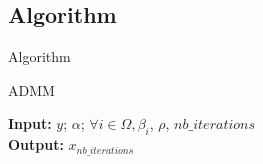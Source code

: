 \subsection{Algorithm}

\frame{
    \tableofcontents[ 
        currentsubsection, 
    ]
}

\begin{frame}{Algorithm}
\begin{algorithm}[H]
    \caption{ADMM} %
    \begin{algorithmic}[1]
        \newline
        \textbf{Input:} $y$; $\alpha$; $\forall i \in \Omega, \beta_{i}$, $\rho$, $nb\_iterations$ \\
        \textbf{Output:} $x_{nb\_iterations}$
        \EndFor
        \EndProcedure
    \end{algorithmic}
\end{algorithm}
\end{frame}


